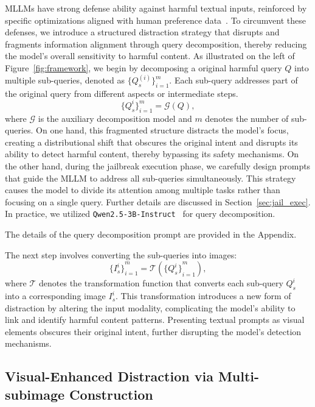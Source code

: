 MLLMs have strong defense ability against harmful textual inputs, reinforced by specific optimizations aligned with human preference data~\citep{katz2024gpt}. To circumvent these defenses, we introduce a structured distraction strategy that disrupts and fragments information alignment through query decomposition, thereby reducing the model’s overall sensitivity to harmful content. As illustrated on the left of Figure~\ref{fig:framework}, we begin by decomposing a original harmful query $Q$ into multiple sub-queries, denoted as $\{Q_s^{(i)}\}_{i=1}^{m}$. Each sub-query addresses part of the original query from different aspects or intermediate steps.
\begin{equation}
    \{Q_s^i\}_{i=1}^{m} = \mathcal{G}(Q),
\end{equation}
where $\mathcal{G}$ is the auxiliary decomposition model and $m$ denotes the number of sub-queries. On one hand, this fragmented structure distracts the model’s focus, creating a distributional shift that obscures the original intent and disrupts its ability to detect harmful content, thereby bypassing its safety mechanisms. On the other hand, during the jailbreak execution phase, we carefully design prompts that guide the MLLM to address all sub-queries simultaneously. This strategy causes the model to divide its attention among multiple tasks rather than focusing on a single query. Further details are discussed in Section~\ref{sec:jail_exec}. In practice, we utilized \texttt{Qwen2.5-3B-Instruct}~\cite{qwen2.5} for query decomposition. 
 
The details of the query decomposition prompt are provided in the Appendix. 


The next step involves converting the sub-queries into images:
\begin{equation}
    {\{I_s^i\}}_{i=1}^{m} = \mathcal{T}(\{{Q_s^i\}}_{i=1}^{m}),
\end{equation}
where $\mathcal{T}$ denotes the transformation function that converts each sub-query $Q_s^i$ into a corresponding image  $I_s^i$. This transformation introduces a new form of distraction by altering the input modality, complicating the model’s ability to link and identify harmful content patterns. Presenting textual prompts as visual elements obscures their original intent, further disrupting the model’s detection mechanisms.


\subsection{Visual-Enhanced Distraction via Multi-subimage Construction}
\label{subsec:visualdistraction}

